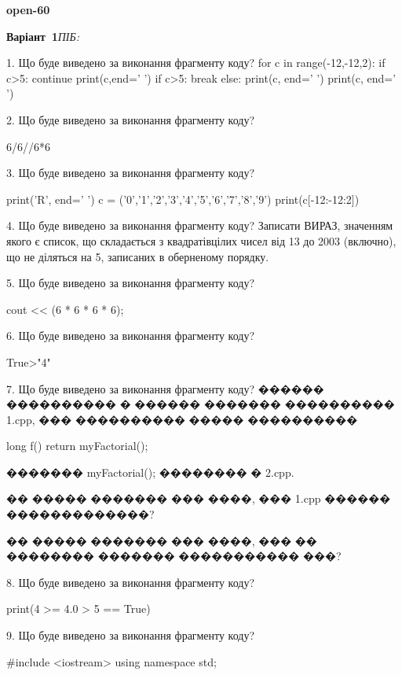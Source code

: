 \documentclass[11pt]{article}
\begin{document}
{\large\textbf{open-60}}

\textbf{Варіант \No\,1}\hfill \textit{ПІБ:}\,\underline{\hspace{60mm}}
\vspace{4mm}

1. Що буде виведено за виконання фрагменту коду?
for c in range(-12,-12,2):
    if c>5:
        continue
        print(c,end=' ')
    if c>5:
        break
else:
    print(c, end=' ')
print(c, end=' ')

2. Що буде виведено за виконання фрагменту коду?

6/6//6*6

3. Що буде виведено за виконання фрагменту коду?

print('R', end=' ')
c = ('0','1','2','3','4','5','6','7','8','9')
print(c[-12:-12:2])


4. Що буде виведено за виконання фрагменту коду?
Записати ВИРАЗ, значенням якого є список, що складається з квадратівцілих чисел від 13 до 2003 (включно), що не діляться на 5, записаних в обернено\-му порядку.

5. Що буде виведено за виконання фрагменту коду?

cout << (6 * 6 * 6 * 6);

6. Що буде виведено за виконання фрагменту коду?

True>"4"

7. Що буде виведено за виконання фрагменту коду?
������ ���������� � ������ ������� ���������� 1.cpp, ��� ���������� ����� ����������\par
long f(){ return myFactorial();}\par
������� myFactorial(); �������� � 2.cpp.\par
�� ����� ������� ��� ����, ��� 1.cpp ������ �������������?\par\vspace{1.5cm}
�� ����� ������� ��� ����, ��� �� �������� ������� ����������� ���?\par

8. Що буде виведено за виконання фрагменту коду?

print(4 >= 4.0 > 5 == True)

9. Що буде виведено за виконання фрагменту коду?

#include <iostream>
using namespace std;
\end{document}
